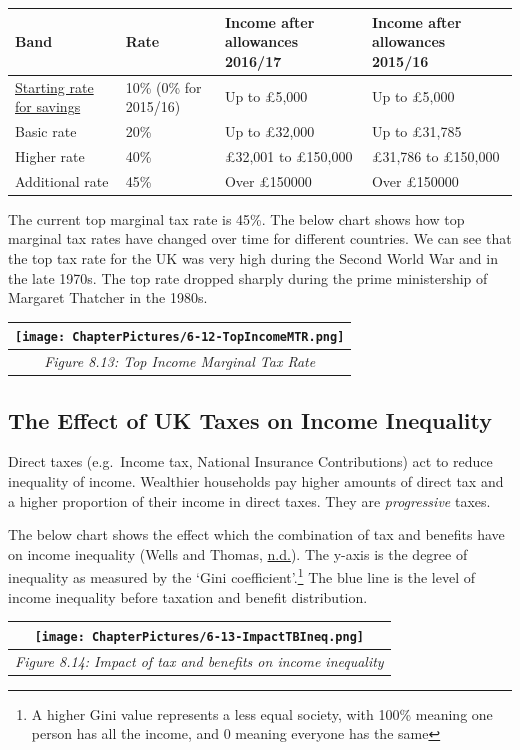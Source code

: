 \documentclass[]{tufte-handout}
\begin{document}
\begin{longtable}[]{@{}llll@{}}
\toprule
Band & Rate & Income after allowances 2016/17 & Income after allowances
2015/16\tabularnewline
\midrule
\endhead
\href{http://www.gov.uk/apply-tax-free-interest-on-savings/10-savings-rate}{Starting
rate for savings} & 10\% (0\% for 2015/16) & Up to £5,000 & Up to
£5,000\tabularnewline
Basic rate & 20\% & Up to £32,000 & Up to £31,785\tabularnewline
Higher rate & 40\% & £32,001 to £150,000 & £31,786 to
£150,000\tabularnewline
Additional rate & 45\% & Over £150000 & Over £150000\tabularnewline
\bottomrule
\end{longtable}

The current top marginal tax rate is 45\%. The below chart shows how top
marginal tax rates have changed over time for different countries. We
can see that the top tax rate for the UK was very high during the Second
World War and in the late 1970s. The top rate dropped sharply during the
prime ministership of Margaret Thatcher in the 1980s.

\begin{longtable}[]{@{}c@{}}
\toprule
\texttt{[image: ChapterPictures/6-12-TopIncomeMTR.png]}\tabularnewline
\midrule
\endhead
\emph{Figure 8.13: Top Income Marginal Tax Rate}\tabularnewline
\bottomrule
\end{longtable}

\hypertarget{the-effect-of-uk-taxes-on-income-inequality}{%
\subsection{The Effect of UK Taxes on Income
Inequality}\label{the-effect-of-uk-taxes-on-income-inequality}}

Direct taxes (e.g.~Income tax, National Insurance Contributions) act to
reduce inequality of income. Wealthier households pay higher amounts of
direct tax and a higher proportion of their income in direct taxes. They
are \emph{progressive} taxes.

The below chart shows the effect which the combination of tax and
benefits have on income inequality (Wells and Thomas,
\protect\hyperlink{ref-Wells}{n.d.}). The y-axis is the degree of
inequality as measured by the `Gini coefficient'.\footnote{A higher Gini
  value represents a less equal society, with 100\% meaning one person
  has all the income, and 0 meaning everyone has the same} The blue line
is the level of income inequality before taxation and benefit
distribution.

\begin{longtable}[]{@{}c@{}}
\toprule
\texttt{[image: ChapterPictures/6-13-ImpactTBIneq.png]}\tabularnewline
\midrule
\endhead
\emph{Figure 8.14: Impact of tax and benefits on income
inequality}\tabularnewline
\bottomrule
\end{longtable}
\end{document}
